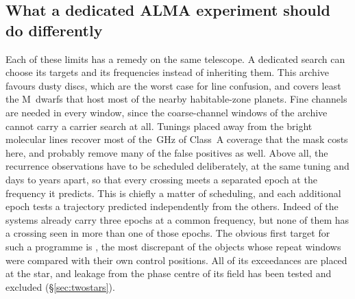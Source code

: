 \subsection{What a dedicated ALMA experiment should do differently}
\label{sec:future}

Each of these limits has a remedy on the same telescope. A dedicated search
can choose its targets and its frequencies instead of inheriting them. This
archive favours dusty discs, which are the worst case for line confusion, and
covers least the M~dwarfs that host most of the nearby habitable-zone
planets. Fine channels are needed in every window, since the \NCoarse{}
coarse-channel windows of the archive cannot carry a carrier search at all.
Tunings placed away from the bright molecular lines recover most of the
\MkMaskAGHz\,GHz of Class~A coverage that the mask costs here, and probably
remove many of the false positives as well. Above all, the recurrence
observations have to be scheduled deliberately, at the same tuning and days
to years apart, so that every crossing meets a separated epoch at the
frequency it predicts. This is chiefly a matter of scheduling, and each
additional epoch tests a trajectory predicted independently from the others.
Indeed \PaNSysThree{} of the \NSysClassA{} systems already carry three epochs
at a common frequency, but none of them has a crossing seen in more than one
of those epochs. The obvious first target for such a programme is
\BkAlmaName, the most discrepant of the objects whose repeat windows were
compared with their own control positions. All \TwJxNCrossExcWord{} of its
exceedances are placed at the star, and leakage from the phase centre of
its field has been tested and excluded (\S\ref{sec:twostars}).
